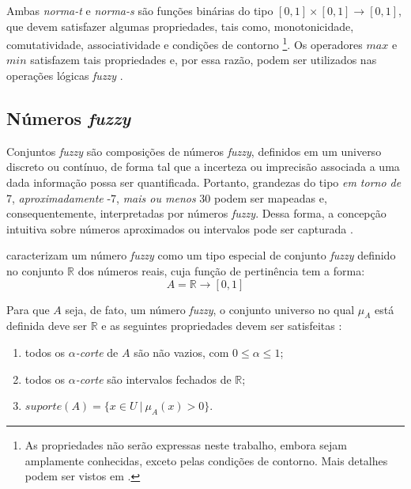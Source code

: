 Ambas \emph{norma-t} e \emph{norma-s} são funções binárias do tipo $[0, 1] \times [0, 1] \rightarrow [0, 1]$, que devem satisfazer algumas propriedades, tais como, monotonicidade, comutatividade, associatividade e condições de contorno \footnote{As propriedades não serão expressas neste trabalho, embora sejam amplamente conhecidas, exceto pelas condições de contorno. Mais detalhes podem ser vistos em \citet{zimmermann:01}.}. Os operadores $max$ e $min$ satisfazem tais propriedades e, por essa razão, podem ser utilizados nas operações lógicas \emph{fuzzy} \citep{zimmermann:01}.


\subsection{Números \emph{fuzzy}}
\label{sec:numeros_fuzzy}
Conjuntos \emph{fuzzy} são composições de números \emph{fuzzy}, definidos em um universo discreto ou contínuo, de forma tal que a incerteza ou imprecisão associada a uma dada informação possa ser quantificada. Portanto, grandezas do tipo \emph{em torno de} 7, \emph{aproximadamente} -7, \emph{mais ou menos} 30 podem ser mapeadas e, consequentemente, interpretadas por números \emph{fuzzy}. Dessa forma, a concepção intuitiva sobre números aproximados ou intervalos pode ser capturada \citep{klir:95}.

\citet{klir:95} caracterizam um número \emph{fuzzy} como um tipo especial de conjunto \emph{fuzzy} definido no conjunto $\mathbb{R}$ dos números reais, cuja função de pertinência tem a forma:
\begin{equation}
\label{eq:fuzzy_numero_reais}
  A = \mathbb{R} \rightarrow [0, 1]
\end{equation}

Para que $A$ seja, de fato, um número \emph{fuzzy}, o conjunto universo no qual $\mu_A$ está definida deve ser $\mathbb{R}$ e as seguintes propriedades devem ser satisfeitas \citep{barros:06}:
\begin{enumerate}[label=(\roman*)]
\item todos os $\alpha$\emph{-corte} de $A$ são não vazios, com $0 \leq \alpha \leq 1$;
\item todos os $\alpha$\emph{-corte} são intervalos fechados de $\mathbb{R}$;
\item $suporte(A) = \{x \in U \ |\ \mu_A(x) > 0\}$.
\end{enumerate}

